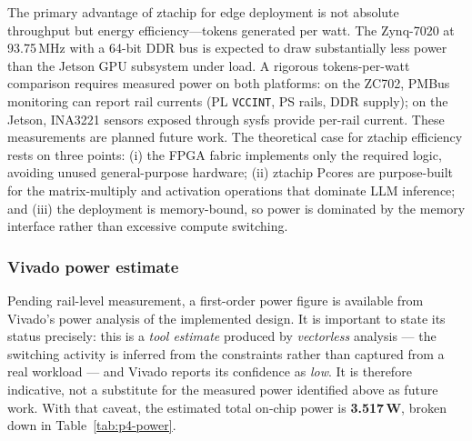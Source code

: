 The primary advantage of ztachip for edge deployment is not absolute throughput but energy
efficiency---tokens generated per watt. The Zynq-7020 at 93.75\,MHz with a 64-bit DDR bus is expected
to draw substantially less power than the Jetson GPU subsystem under load. A rigorous tokens-per-watt
comparison requires measured power on both platforms: on the ZC702, PMBus monitoring can report rail
currents (PL \texttt{VCCINT}, PS rails, DDR supply); on the Jetson, INA3221 sensors exposed through
sysfs provide per-rail current. These measurements are planned future work. The theoretical case for
ztachip efficiency rests on three points: (i) the FPGA fabric implements only the required logic,
avoiding unused general-purpose hardware; (ii) ztachip Pcores are purpose-built for the
matrix-multiply and activation operations that dominate LLM inference; and (iii) the deployment is
memory-bound, so power is dominated by the memory interface rather than excessive compute switching.

\subsubsection*{Vivado power estimate}

Pending rail-level measurement, a first-order power figure is available from Vivado's power analysis
of the implemented design. It is important to state its status precisely: this is a \emph{tool
estimate} produced by \emph{vectorless} analysis --- the switching activity is inferred from the
constraints rather than captured from a real workload --- and Vivado reports its confidence as
\emph{low}. It is therefore indicative, not a substitute for the measured power identified above as
future work. With that caveat, the estimated total on-chip power is \textbf{3.517\,W}, broken down in
Table~\ref{tab:p4-power}.

